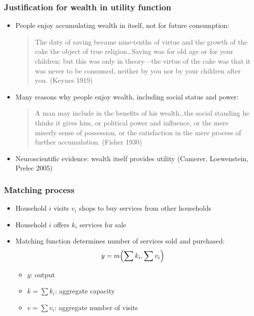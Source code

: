 \documentclass[11pt,aspectratio=169,xcolor={dvipsnames},hyperref={pdftex,pdfpagemode=UseNone,hidelinks,pdfdisplaydoctitle=true},usepdftitle=false]{beamer}
\begin{document}
\begin{frame}
\frametitle{Justification for wealth in utility function}
\begin{itemize}
\item People enjoy accumulating wealth in itself, not for future consumption:\vspace*{2mm}
\begin{quote}
The duty of saving became nine-tenths of virtue and the growth of the cake the object of true religion\ldots Saving was for old age or for your children; but this was only in theory---the virtue of the cake was that it was never to be consumed, neither by you nor by your children after you. (Keynes 1919)
\end{quote}\vspace*{-2mm}
\item Many reasons why people enjoy wealth, including social status and power:\vspace*{2mm}
\begin{quote}
A man may include in the benefits of his wealth\ldots the social standing he thinks it gives him, or political power and influence, or the mere miserly sense of possession, or the satisfaction in the mere process of further accumulation. (Fisher 1930)
\end{quote}\vspace*{-2mm}
\item Neuroscientific evidence: wealth itself provides utility (Camerer, Loewenstein, Prelec 2005)
\end{itemize}	
\end{frame}

\begin{frame}
\frametitle{Matching process}
\begin{itemize}
\item Household $i$ visits $v_i$ shops to buy services from other households
\item Household $i$ offers $k_i$ services for sale
\item Matching function determines number of services sold and purchased:
\begin{equation*}
y = m{\left( \sum k_i, \sum v_i \right)}
\end{equation*}\vspace*{-5mm}
\begin{itemize}
	\item $y$: output
	\item $k = \sum k_i$: aggregate capacity
	\item $v = \sum v_i$: aggregate number of visits
\end{itemize}
\end{itemize}	
\end{frame}
\end{document}
